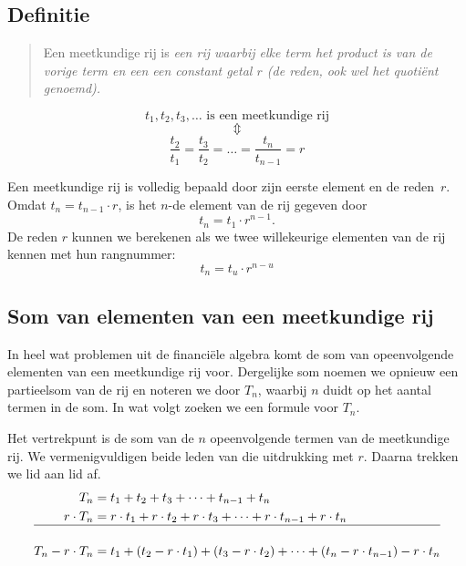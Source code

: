 \subsection{Definitie}
\begin{quote}
Een meetkundige rij is \emph{een rij waarbij elke term het product is van de vorige term en een een constant getal $r$ (de \emph{reden}, ook wel het \emph{quotiënt} genoemd).}
\end{quote}
    \begin{displaymath}
             t_1, t_2, t_3, \dots 
        \mbox{ is een meetkundige rij}
    \end{displaymath}
    \begin{displaymath}
         \Updownarrow
    \end{displaymath}
    \begin{displaymath}
         \frac{t_{2}}{t_{1}}=\frac{t_{3}}{t_{2}}=\dots =\frac{t_{n}}{t_{n-1}}=r
    \end{displaymath}

Een meetkundige rij is volledig bepaald door zijn eerste element en de reden~$r$. Omdat $t_n=t_{n-1}\cdot r$, is het $n$-de element van de rij gegeven door
\begin{equation}
\label{eq:rec_mr}
t_n=t_1\cdot r^{n-1}.
\end{equation}
De reden $r$ kunnen we berekenen als we twee willekeurige elementen van de rij kennen met hun rangnummer:
\[
t_n=t_u\cdot r^{n-u}
\]

\subsection{Som van elementen van een meetkundige rij}\label{subsec.Tn}
In heel wat problemen uit de financi\"{e}le algebra komt de som van
opeenvolgende elementen van een meetkundige rij voor. Dergelijke som noemen we
opnieuw een partieelsom van de rij en noteren we door $T_{n}$,
waarbij $n$ duidt op het aantal termen in de som. In wat volgt zoeken we een formule voor $T_{n}$.


Het vertrekpunt is de som van de $n$ opeenvolgende termen van de meetkundige rij. We
vermenigvuldigen beide leden van die uitdrukking met $r$. Daarna
trekken we lid aan lid af.
\begin{align*}
    T_{n} &=  t_{1}+t_{2}+t_{3}+\dots +t_{n-1}+t_{n}  \\
    r\cdot T_{n} &= r\cdot t_{1}+r\cdot t_{2}+r\cdot t_{3}+\dots +r\cdot
    t_{n-1}+r\cdot t_{n}  \\ \hline \\
    T_{n}-r\cdot T_{n} &= t_{1}+(t_{2}-r\cdot t_{1})+ (t_{3}-r\cdot
    t_{2})+ \dots +(t_{n}-r\cdot t_{n-1})-r\cdot t_{n}
\end{align*}

